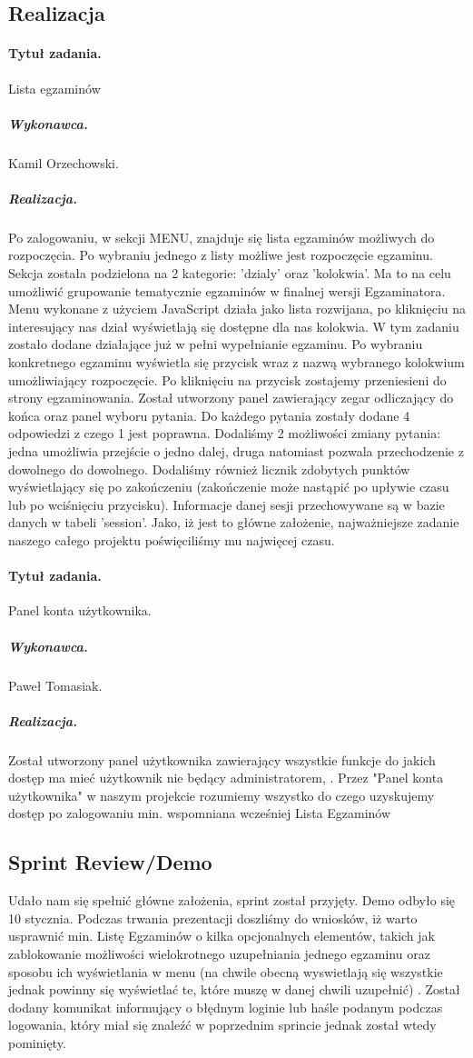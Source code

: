 \documentclass[a4paper]{article}
\begin{document}
\subsection{Realizacja}

\paragraph{Tytuł zadania.}  Lista egzaminów
\subparagraph{Wykonawca.} Kamil Orzechowski.
\subparagraph{Realizacja.} Po zalogowaniu, w sekcji MENU, znajduje się lista egzaminów możliwych do rozpoczęcia. Po wybraniu jednego z listy możliwe jest rozpoczęcie egzaminu. Sekcja została podzielona na 2 kategorie: 'dzialy' oraz 'kolokwia'. Ma to na celu umożliwić grupowanie tematycznie egzaminów w finalnej wersji Egzaminatora. Menu wykonane z użyciem JavaScript działa jako lista rozwijana, po kliknięciu na interesujący nas dział wyświetlają się dostępne dla nas kolokwia. W tym zadaniu zostało dodane działające już w pełni wypełnianie egzaminu. Po wybraniu konkretnego egzaminu wyświetla się przycisk wraz z nazwą wybranego kolokwium umożliwiający rozpoczęcie. Po kliknięciu na przycisk zostajemy przeniesieni do strony egzaminowania.  Został utworzony panel zawierający zegar odliczający do końca oraz panel wyboru pytania. Do każdego pytania zostały dodane 4 odpowiedzi z czego 1 jest poprawna. Dodaliśmy 2 możliwości zmiany pytania: jedna umożliwia przejście o jedno dalej, druga natomiast pozwala przechodzenie z dowolnego do dowolnego. Dodaliśmy również licznik zdobytych punktów wyświetlający się po zakończeniu (zakończenie może nastąpić po upływie czasu lub po wciśnięciu przycisku). Informacje danej sesji przechowywane są w bazie danych w tabeli 'session'. Jako, iż jest to główne założenie, najważniejsze zadanie naszego całego projektu poświęciliśmy mu najwięcej czasu. 

\paragraph{Tytuł zadania.} Panel konta użytkownika.
\subparagraph{Wykonawca.} Paweł Tomasiak.
\subparagraph{Realizacja.} Został utworzony panel użytkownika zawierający wszystkie funkcje do jakich dostęp ma mieć użytkownik nie będący administratorem, . Przez "Panel konta użytkownika" w naszym projekcie rozumiemy wszystko do czego uzyskujemy dostęp po zalogowaniu min. wspomniana wcześniej Lista Egzaminów 
 
\subsection{Sprint Review/Demo}
Udało nam się spełnić główne założenia, sprint został przyjęty. Demo odbyło się 10 stycznia. Podczas trwania prezentacji doszliśmy do wniosków, iż warto usprawnić min. Listę Egzaminów o kilka opcjonalnych elementów, takich jak zablokowanie możliwości wielokrotnego uzupełniania jednego egzaminu oraz sposobu  ich wyświetlania w menu (na chwile obecną wyswietlają się wszystkie jednak powinny się wyświetlać te, które muszę w danej chwili uzupełnić) .  Został dodany komunikat informujący o błędnym loginie lub haśle podanym podczas logowania, który miał się znaleźć w poprzednim sprincie jednak został wtedy pominięty. 
\end{document}
